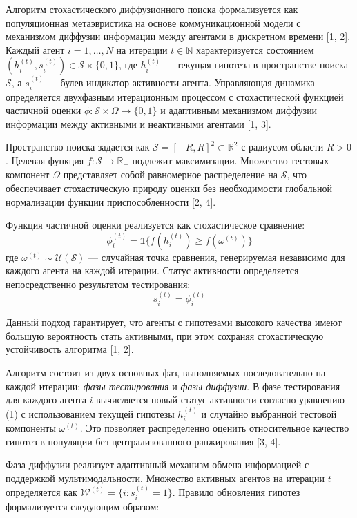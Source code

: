\documentclass{article}
\newcommand{\1}{\mathds{1}}
\begin{document}
Алгоритм стохастического диффузионного поиска формализуется как популяционная метаэвристика на основе коммуникационной модели с механизмом диффузии информации между агентами в дискретном времени [1, 2]. Каждый агент $i = 1, \ldots, N$ на итерации $t \in \mathbb{N}$ характеризуется состоянием $(h_i^{(t)}, s_i^{(t)}) \in \mathcal{S} \times \{0,1\}$, где $h_i^{(t)}$ — текущая гипотеза в пространстве поиска $\mathcal{S}$, а $s_i^{(t)}$ — булев индикатор активности агента. Управляющая динамика определяется двухфазным итерационным процессом с стохастической функцией частичной оценки $\phi: \mathcal{S} \times \Omega \rightarrow \{0,1\}$ и адаптивным механизмом диффузии информации между активными и неактивными агентами [1, 3].

Пространство поиска задается как $\mathcal{S} = [-R, R]^2 \subset \mathbb{R}^2$ с радиусом области $R > 0$. Целевая функция $f: \mathcal{S} \rightarrow \mathbb{R}_+$ подлежит максимизации. Множество тестовых компонент $\Omega$ представляет собой равномерное распределение на $\mathcal{S}$, что обеспечивает стохастическую природу оценки без необходимости глобальной нормализации функции приспособленности [2, 4].

Функция частичной оценки реализуется как стохастическое сравнение:
\begin{equation}
    \phi _i^{(t)} = \mathbb{1} \{ f(h_i^{(t)}) \geq f(\omega^{(t)}) \}
\end{equation}
где $\omega^{(t)} \sim \mathcal{U}(\mathcal{S})$ — случайная точка сравнения, генерируемая независимо для каждого агента на каждой итерации. Статус активности определяется непосредственно результатом тестирования:
\begin{equation}
    s_i^{(t)} = \phi _i^{(t)}
\end{equation}

Данный подход гарантирует, что агенты с гипотезами высокого качества имеют большую вероятность стать активными, при этом сохраняя стохастическую устойчивость алгоритма [1, 2].

Алгоритм состоит из двух основных фаз, выполняемых последовательно на каждой итерации: \textit{фазы тестирования} и \textit{фазы диффузии}. В фазе тестирования для каждого агента $i$ вычисляется новый статус активности согласно уравнению (1) с использованием текущей гипотезы $h_i^{(t)}$ и случайно выбранной тестовой компоненты $\omega^{(t)}$. Это позволяет распределенно оценить относительное качество гипотез в популяции без централизованного ранжирования [3, 4].

Фаза диффузии реализует адаптивный механизм обмена информацией с поддержкой мультимодальности. Множество активных агентов на итерации $t$ определяется как $\mathcal{W}^{(t)} = \{i : s_i^{(t)} = 1\}$. Правило обновления гипотез формализуется следующим образом:
\end{document}

